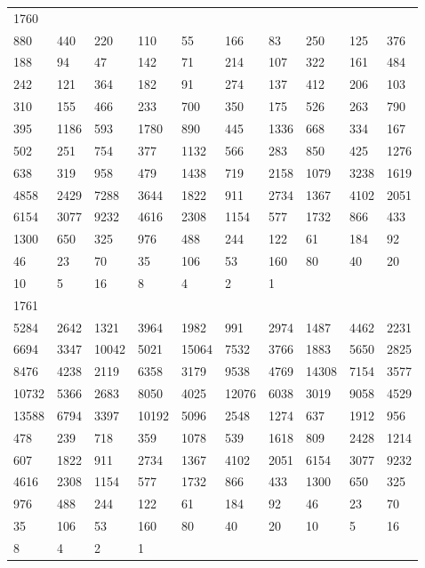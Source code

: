 \begin{longtable}{*{10}{l}}
1760&&&&&&&&&\\
880& 440& 220& 110& 55& 166& 83& 250& 125& 376\\
188& 94& 47& 142& 71& 214& 107& 322& 161& 484\\
242& 121& 364& 182& 91& 274& 137& 412& 206& 103\\
310& 155& 466& 233& 700& 350& 175& 526& 263& 790\\
395& 1186& 593& 1780& 890& 445& 1336& 668& 334& 167\\
502& 251& 754& 377& 1132& 566& 283& 850& 425& 1276\\
638& 319& 958& 479& 1438& 719& 2158& 1079& 3238& 1619\\
4858& 2429& 7288& 3644& 1822& 911& 2734& 1367& 4102& 2051\\
6154& 3077& 9232& 4616& 2308& 1154& 577& 1732& 866& 433\\
1300& 650& 325& 976& 488& 244& 122& 61& 184& 92\\
46& 23& 70& 35& 106& 53& 160& 80& 40& 20\\
10& 5& 16& 8& 4& 2& 1& \\

1761&&&&&&&&&\\
5284& 2642& 1321& 3964& 1982& 991& 2974& 1487& 4462& 2231\\
6694& 3347& 10042& 5021& 15064& 7532& 3766& 1883& 5650& 2825\\
8476& 4238& 2119& 6358& 3179& 9538& 4769& 14308& 7154& 3577\\
10732& 5366& 2683& 8050& 4025& 12076& 6038& 3019& 9058& 4529\\
13588& 6794& 3397& 10192& 5096& 2548& 1274& 637& 1912& 956\\
478& 239& 718& 359& 1078& 539& 1618& 809& 2428& 1214\\
607& 1822& 911& 2734& 1367& 4102& 2051& 6154& 3077& 9232\\
4616& 2308& 1154& 577& 1732& 866& 433& 1300& 650& 325\\
976& 488& 244& 122& 61& 184& 92& 46& 23& 70\\
35& 106& 53& 160& 80& 40& 20& 10& 5& 16\\
8& 4& 2& 1& \\


\end{longtable}
